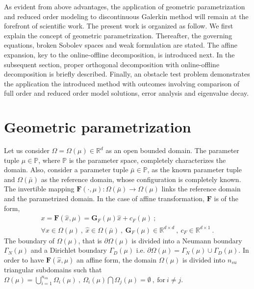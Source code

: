 \documentclass[graybox]{svmult}
\begin{document}
As evident from above advantages, the application of geometric parametrization and reduced order modeling to discontinuous Galerkin method will remain at the forefront of scientific work. The present work is organized as follow. We first explain the concept of geometric parametrization. Thereafter, the governing equations, broken Sobolev spaces and weak formulation are stated. The affine expansion, key to the online-offline decomposition, is introduced next. In the subsequent section, proper orthogonal decomposition with online-offline decomposition is briefly described. Finally, an obstacle test problem demonstrates the application the introduced method with outcomes involving comparison of full order and reduced order model solutions, error analysis and eigenvalue decay.

\section{Geometric parametrization}\label{geometric_parametrization_section}

Let us consider $\Omega = \Omega(\mu) \in \mathbb{R}^d$ as an open bounded domain. The parameter tuple $\mu \in \mathbb{P}$, where $\mathbb{P}$ is the parameter space, completely characterizes the domain. Also, consider a parameter tuple $\bar{\mu} \in \mathbb{P}$, as the known parameter tuple and $\Omega(\bar{\mu})$ as the reference domain, whose configuration is completely known. The invertible mapping $\bm{F}(\cdot,\mu) : \Omega(\bar{\mu}) \rightarrow \Omega(\mu)$ links the reference domain and the parametrized domain. In the case of affine transformation, $\bm{F}$ is of the form,
\begin{equation*}\label{affine_F}
\begin{split}
x = \bm{F}(\hat{x},\mu) = \bm{G}_F(\mu)\hat{x} + c_F(\mu) \ ; \\ \forall x \in \Omega(\mu) \ , \ \hat{x} \in \Omega(\bar{\mu}) \ , \ \bm{G}_F(\mu) \in \mathbb{R}^{d \times d} \ , \ c_F \in \mathbb{R}^{d \times 1} \ .
\end{split}
\end{equation*}
The boundary of $\Omega(\mu)$, that is $\partial \Omega(\mu)$ is divided into a  Neumann boundary $\Gamma_N(\mu)$ and a Dirichlet boundary $\Gamma_D(\mu)$ i.e. $\partial \Omega(\mu) = \Gamma_N(\mu) \cup \Gamma_D(\mu)$. In order to have $\bm{F}(\hat{x},\mu)$ an affine form, the domain $\Omega(\mu)$ is divided into $n_{su}$ triangular subdomains such that $\Omega(\mu) = \bigcup\limits_{i=1}^{n_{su}} \Omega_i(\mu) \ , \ \Omega_i(\mu) \bigcap \Omega_j(\mu) = \emptyset \ , \ \text{for} \ i \neq j$.
\end{document}
